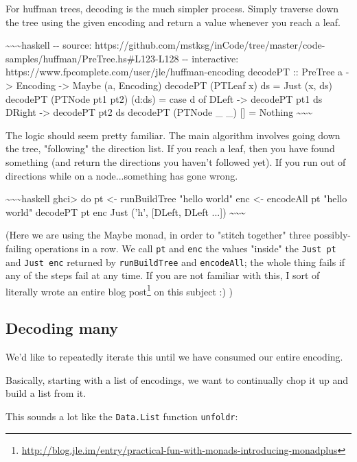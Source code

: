 \documentclass[]{article}
\renewcommand{\href}[2]{#2\footnote{\url{#1}}}
\begin{document}
For huffman trees, decoding is the much simpler process. Simply traverse down
the tree using the given encoding and return a value whenever you reach a leaf.

\textasciitilde{}\textasciitilde{}\textasciitilde{}haskell -\/- source:
https://github.com/mstksg/inCode/tree/master/code-samples/huffman/PreTree.hs\#L123-L128
-\/- interactive: https://www.fpcomplete.com/user/jle/huffman-encoding decodePT
:: PreTree a -\textgreater{} Encoding -\textgreater{} Maybe (a, Encoding)
decodePT (PTLeaf x) ds = Just (x, ds) decodePT (PTNode pt1 pt2) (d:ds) = case d
of DLeft -\textgreater{} decodePT pt1 ds DRight -\textgreater{} decodePT pt2 ds
decodePT (PTNode \_ \_) {[}{]} = Nothing
\textasciitilde{}\textasciitilde{}\textasciitilde{}

The logic should seem pretty familiar. The main algorithm involves going down
the tree, "following" the direction list. If you reach a leaf, then you have
found something (and return the directions you haven't followed yet). If you run
out of directions while on a node...something has gone wrong.

\textasciitilde{}\textasciitilde{}\textasciitilde{}haskell ghci\textgreater{} do
pt \textless{}- runBuildTree "hello world" \textbar{} enc \textless{}- encodeAll
pt "hello world" \textbar{} decodePT pt enc Just ('h', {[}DLeft, DLeft ...{]})
\textasciitilde{}\textasciitilde{}\textasciitilde{}

(Here we are using the Maybe monad, in order to "stitch together" three
possibly-failing operations in a row. We call \texttt{pt} and \texttt{enc} the
values "inside" the \texttt{Just\ pt} and \texttt{Just\ enc} returned by
\texttt{runBuildTree} and \texttt{encodeAll}; the whole thing fails if any of
the steps fail at any time. If you are not familiar with this,
\href{http://blog.jle.im/entry/practical-fun-with-monads-introducing-monadplus}{I
sort of literally wrote an entire blog post} on this subject :) )

\subsection{Decoding many}

We'd like to repeatedly iterate this until we have consumed our entire encoding.

Basically, starting with a list of encodings, we want to continually chop it up
and build a list from it.

This sounds a lot like the \texttt{Data.List} function \texttt{unfoldr}:
\end{document}
